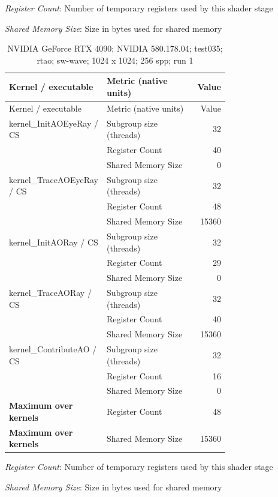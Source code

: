 \noindent\textit{Register Count}: Number of temporary registers used by this shader stage\par
\noindent\textit{Shared Memory Size}: Size in bytes used for shared memory\par
\begin{longtable}{p{0.30\linewidth}p{0.43\linewidth}r}
\caption{NVIDIA GeForce RTX 4090; NVIDIA 580.178.04; test035; rtao; sw-wave; 1024 x 1024; 256 spp; run 1}\label{tab:hydra-profile-19}\\
\hline Kernel / executable & Metric (native units) & Value \\\hline
\endfirsthead
\hline Kernel / executable & Metric (native units) & Value \\\hline
\endhead
kernel\_InitAOEyeRay / CS & Subgroup size (threads) & 32 \\
 & Register Count & 40 \\
 & Shared Memory Size & 0 \\
\hline
kernel\_TraceAOEyeRay / CS & Subgroup size (threads) & 32 \\
 & Register Count & 48 \\
 & Shared Memory Size & 15360 \\
\hline
kernel\_InitAORay / CS & Subgroup size (threads) & 32 \\
 & Register Count & 29 \\
 & Shared Memory Size & 0 \\
\hline
kernel\_TraceAORay / CS & Subgroup size (threads) & 32 \\
 & Register Count & 40 \\
 & Shared Memory Size & 15360 \\
\hline
kernel\_ContributeAO / CS & Subgroup size (threads) & 32 \\
 & Register Count & 16 \\
 & Shared Memory Size & 0 \\
\hline
\textbf{Maximum over kernels} & Register Count & 48 \\
\textbf{Maximum over kernels} & Shared Memory Size & 15360 \\
\hline
\end{longtable}
\noindent\textit{Register Count}: Number of temporary registers used by this shader stage\par
\noindent\textit{Shared Memory Size}: Size in bytes used for shared memory\par
